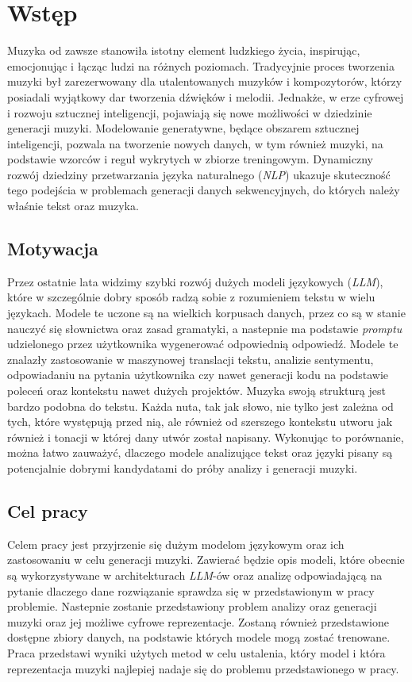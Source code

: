 \documentclass[data-science]{agh-wi} %
\begin{document}
\chapter{Wstęp}
Muzyka od zawsze stanowiła istotny element ludzkiego życia, inspirując, emocjonując i łącząc ludzi na różnych poziomach. Tradycyjnie proces tworzenia muzyki był zarezerwowany dla utalentowanych muzyków i kompozytorów, którzy posiadali wyjątkowy dar tworzenia dźwięków i melodii. Jednakże, w erze cyfrowej i rozwoju sztucznej inteligencji, pojawiają się nowe możliwości w dziedzinie generacji muzyki. Modelowanie generatywne, będące obszarem sztucznej inteligencji, pozwala na tworzenie nowych danych, w tym również muzyki, na podstawie wzorców i reguł wykrytych w zbiorze treningowym. Dynamiczny rozwój dziedziny przetwarzania języka naturalnego (\textit{NLP}) ukazuje skuteczność tego podejścia w problemach generacji danych sekwencyjnych, do których należy właśnie tekst oraz muzyka.
\section{Motywacja}
Przez ostatnie lata widzimy szybki rozwój dużych modeli językowych (\textit{LLM}), które w szczególnie dobry sposób radzą sobie z rozumieniem tekstu w wielu językach. Modele te uczone są na wielkich korpusach danych, przez co są w stanie nauczyć się słownictwa oraz zasad gramatyki, a nastepnie ma podstawie \textit{promptu} udzielonego przez użytkownika wygenerować odpowiednią odpowiedź. Modele te znalazły zastosowanie w maszynowej translacji tekstu, analizie sentymentu, odpowiadaniu na pytania użytkownika czy nawet generacji kodu na podstawie poleceń oraz kontekstu nawet dużych projektów. Muzyka swoją strukturą jest bardzo podobna do tekstu. Każda nuta, tak jak słowo, nie tylko jest zależna od tych, które występują przed nią, ale również od szerszego kontekstu utworu jak również i tonacji w której dany utwór został napisany. Wykonując to porównanie, można łatwo zauważyć, dlaczego modele analizujące tekst oraz języki pisany są potencjalnie dobrymi kandydatami do próby analizy i generacji muzyki.
\section{Cel pracy}
Celem pracy jest przyjrzenie się dużym modelom językowym oraz ich zastosowaniu w celu generacji muzyki. Zawierać będzie opis modeli, które obecnie są wykorzystywane w architekturach \textit{LLM}-ów oraz analizę odpowiadającą na pytanie dlaczego dane rozwiązanie sprawdza się w przedstawionym w pracy problemie. Nastepnie zostanie przedstawiony problem analizy oraz generacji muzyki oraz jej możliwe cyfrowe reprezentacje. Zostaną również przedstawione dostępne zbiory danych, na podstawie których modele mogą zostać trenowane. Praca przedstawi wyniki użytych metod w celu ustalenia, który model i która reprezentacja muzyki najlepiej nadaje się do problemu przedstawionego w pracy.
\end{document}
